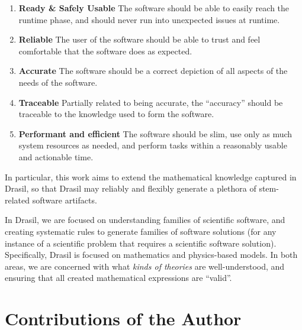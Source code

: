 \begin{enumerate}

      \item \textbf{Ready \& Safely Usable} The software should be able to
            easily reach the runtime phase, and should never run into unexpected
            issues at runtime.

      \item \textbf{Reliable} The user of the software should be able to trust
            and feel comfortable that the software does as expected.

      \item \textbf{Accurate} The software should be a correct depiction of all
            aspects of the needs of the software.

      \item \textbf{Traceable} Partially related to being accurate, the
            ``accuracy'' should be traceable to the knowledge used to form the
            software.

      \item \textbf{Performant and efficient} The software should be slim, use
            only as much system resources as needed, and perform tasks within a
            reasonably usable and actionable time.

\end{enumerate}

In particular, this work aims to extend the mathematical knowledge captured in
Drasil, so that Drasil may reliably and flexibly generate a plethora of
\acs{stem}-related software artifacts.


In Drasil, we are focused on understanding families of scientific software, and
creating systematic rules to generate families of software solutions (for any
instance of a scientific problem that requires a scientific software solution).
Specifically, Drasil is focused on mathematics and physics-based models. In both
areas, we are concerned with what \textit{kinds of theories} are
well-understood, and ensuring that all created mathematical expressions are
``valid''.

\section{Contributions of the Author}
\label{sec:intro:contributions}

